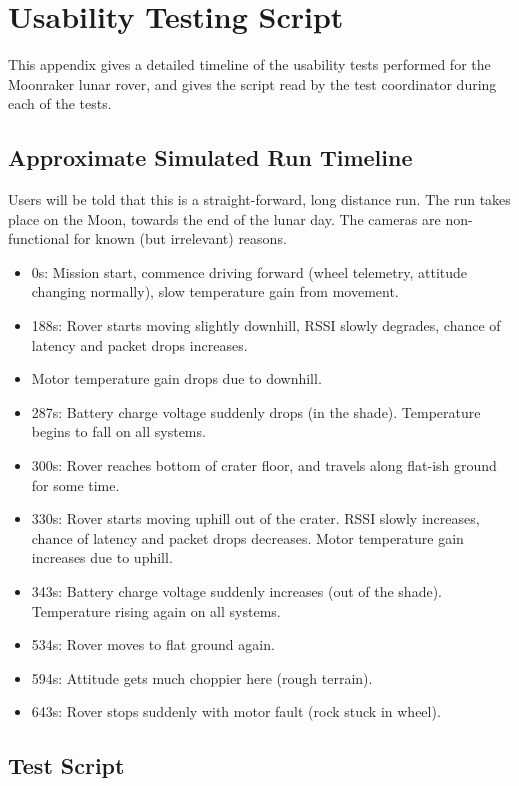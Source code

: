 \chapter{Usability Testing Script}

This appendix gives a detailed timeline of the usability tests performed for the Moonraker lunar rover, and gives the script read by the test coordinator during each of the tests.

\section{Approximate Simulated Run Timeline}

Users will be told that this is a straight-forward, long distance run. The run takes place on the Moon, towards the end of the lunar day. The cameras are non-functional for known (but irrelevant) reasons. 

\begin{itemize}

\item 0s: Mission start, commence driving forward (wheel telemetry, attitude changing normally), slow temperature gain from movement.
\item 188s: Rover starts moving slightly downhill, RSSI slowly degrades, chance of latency and packet drops increases.
\item Motor temperature gain drops due to downhill.
\item 287s: Battery charge voltage suddenly drops (in the shade). Temperature begins to fall on all systems.
\item 300s: Rover reaches bottom of crater floor, and travels along flat-ish ground for some time.
\item 330s: Rover starts moving uphill out of the crater. RSSI slowly increases, chance of latency and packet drops decreases. Motor temperature gain increases due to uphill.
\item 343s: Battery charge voltage suddenly increases (out of the shade). Temperature rising again on all systems.
\item 534s: Rover moves to flat ground again.
\item 594s: Attitude gets much choppier here (rough terrain).
\item 643s: Rover stops suddenly with motor fault (rock stuck in wheel).

\end{itemize}

\section{Test Script}

